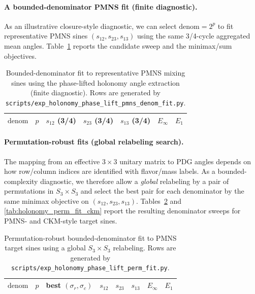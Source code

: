 \paragraph{A bounded-denominator PMNS fit (finite diagnostic).}
As an illustrative closure-style diagnostic, we can select $\mathrm{denom}=2^p$ to fit representative PMNS sines $(s_{12},s_{23},s_{13})$ using the same 3/4-cycle aggregated mean angles.
Table~\ref{tab:holonomy_pmns_denom_fit} reports the candidate sweep and the minimax/sum objectives.

\begin{table}[t]
\centering
\scriptsize
\setlength{\tabcolsep}{6pt}
\renewcommand{\arraystretch}{1.15}
\begin{tabular}{rrrrrrr}
\toprule
$\mathrm{denom}$ & $p$ & $s_{12}$ (3/4) & $s_{23}$ (3/4) & $s_{13}$ (3/4) & $E_\infty$ & $E_1$ \\
\midrule
%
\end{tabular}
\caption{Bounded-denominator fit to representative PMNS mixing sines using the phase-lifted holonomy angle extraction (finite diagnostic). Rows are generated by \texttt{scripts/exp\_holonomy\_phase\_lift\_pmns\_denom\_fit.py}.}
\label{tab:holonomy_pmns_denom_fit}
\end{table}

\paragraph{Permutation-robust fits (global relabeling search).}
The mapping from an effective $3\times 3$ unitary matrix to PDG angles depends on how row/column indices are identified with flavor/mass labels.
As a bounded-complexity diagnostic, we therefore allow a \emph{global} relabeling by a pair of permutations in $S_3\times S_3$ and select the best pair for each denominator by the same minimax objective on $(s_{12},s_{23},s_{13})$.
Tables~\ref{tab:holonomy_perm_fit_pmns} and \ref{tab:holonomy_perm_fit_ckm} report the resulting denominator sweeps for PMNS- and CKM-style target sines.

\begin{table}[t]
\centering
\scriptsize
\setlength{\tabcolsep}{4pt}
\renewcommand{\arraystretch}{1.15}
\begin{tabular}{rrrrrrrr}
\toprule
$\mathrm{denom}$ & $p$ & best $(\sigma_r,\sigma_c)$ & $s_{12}$ & $s_{23}$ & $s_{13}$ & $E_\infty$ & $E_1$ \\
\midrule
%
\end{tabular}
\caption{Permutation-robust bounded-denominator fit to PMNS target sines using a global $S_3\times S_3$ relabeling. Rows are generated by \texttt{scripts/exp\_holonomy\_phase\_lift\_perm\_fit.py}.}
\label{tab:holonomy_perm_fit_pmns}
\end{table}

